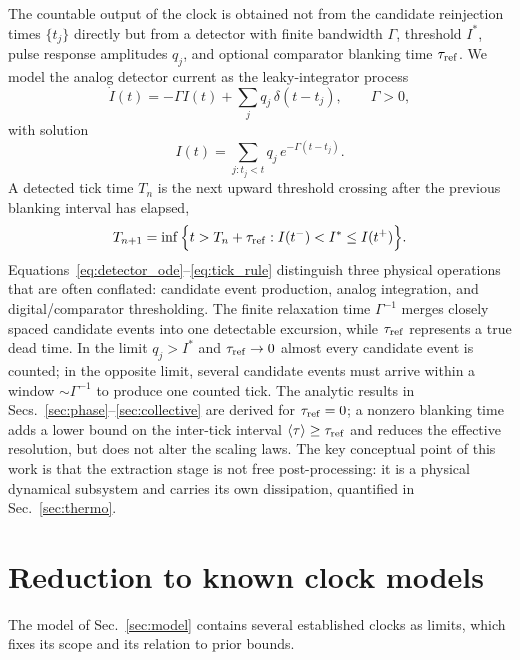 \documentclass[aps,pre,reprint,amsmath,amssymb,floatfix,nofootinbib]{revtex4-2}
\newcommand{\avg}[1]{\langle #1 \rangle}
\begin{document}
The countable output of the clock is obtained not from the candidate
reinjection times $\{t_j\}$ directly but from a detector with finite
bandwidth $\Gamma$, threshold $I^\ast$, pulse response amplitudes $q_j$,
and optional comparator blanking time $\tau_{\rm ref}$. We model the
analog detector current as the leaky-integrator process
\begin{equation}
  \dot I(t)=-\Gamma I(t)+\sum_j q_j\,\delta(t-t_j),
  \qquad \Gamma>0,
  \label{eq:detector_ode}
\end{equation}
with solution
\begin{equation}
  I(t)=\sum_{j:t_j<t}q_j\,e^{-\Gamma(t-t_j)} .
  \label{eq:detector_solution}
\end{equation}
A detected tick time $T_n$ is the next upward threshold crossing after
the previous blanking interval has elapsed,
\begin{equation}
  T_{n+1}=\inf\Big\{t>T_n+\tau_{\rm ref}:
  I(t^-)<I^\ast\le I(t^+)\Big\} .
  \label{eq:tick_rule}
\end{equation}
Equations~\eqref{eq:detector_ode}--\eqref{eq:tick_rule} distinguish
three physical operations that are often conflated: candidate event
production, analog integration, and digital/comparator thresholding. The
finite relaxation time $\Gamma^{-1}$ merges closely spaced candidate
events into one detectable excursion, while $\tau_{\rm ref}$ represents a
true dead time. In the limit $q_j>I^\ast$ and $\tau_{\rm ref}\to0$ almost
every candidate event is counted; in the opposite limit, several
candidate events must arrive within a window $\sim\Gamma^{-1}$ to produce
one counted tick. The analytic results in Secs.~\ref{sec:phase}--\ref{sec:collective}
are derived for $\tau_{\rm ref}=0$; a nonzero blanking time adds a
lower bound on the inter-tick interval $\avg{\tau}\ge\tau_{\rm ref}$ and
reduces the effective resolution, but does not alter the scaling laws. The
key conceptual point of this work is that the extraction stage is not free
post-processing: it is a physical dynamical subsystem and carries its own
dissipation, quantified in Sec.~\ref{sec:thermo}.

\section{Reduction to known clock models}
\label{sec:limits}

The model of Sec.~\ref{sec:model} contains several established clocks as
limits, which fixes its scope and its relation to prior bounds.
\end{document}
